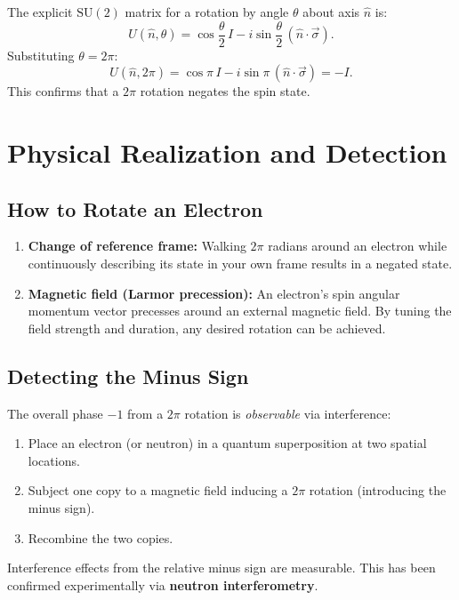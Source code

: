 \documentclass[11pt,a4paper]{article}
\theoremstyle{definition}
\theoremstyle{plain}
\theoremstyle{remark}
\begin{document}
The explicit $\mathrm{SU}(2)$ matrix for a rotation by angle $\theta$ about axis $\hat{n}$ is:
\[
    U(\hat{n}, \theta) = \cos\frac{\theta}{2}\, I - i\sin\frac{\theta}{2}\, (\hat{n}\cdot\vec{\sigma}).
\]
Substituting $\theta = 2\pi$:
\[
    U(\hat{n}, 2\pi) = \cos\pi\, I - i\sin\pi\, (\hat{n}\cdot\vec{\sigma}) = -I.
\]
This confirms that a $2\pi$ rotation negates the spin state.

\section{Physical Realization and Detection}

\subsection{How to Rotate an Electron}

\begin{enumerate}
    \item \textbf{Change of reference frame:} Walking $2\pi$ radians around an electron while continuously describing its state in your own frame results in a negated state.
    \item \textbf{Magnetic field (Larmor precession):} An electron's spin angular momentum vector precesses around an external magnetic field. By tuning the field strength and duration, any desired rotation can be achieved.
\end{enumerate}

\subsection{Detecting the Minus Sign}

The overall phase $-1$ from a $2\pi$ rotation is \emph{observable} via interference:
\begin{enumerate}
    \item Place an electron (or neutron) in a quantum superposition at two spatial locations.
    \item Subject one copy to a magnetic field inducing a $2\pi$ rotation (introducing the minus sign).
    \item Recombine the two copies.
\end{enumerate}
Interference effects from the relative minus sign are measurable. This has been confirmed experimentally via \textbf{neutron interferometry}.
\end{document}
